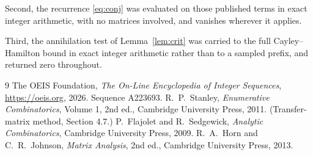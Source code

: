 \documentclass[11pt,a4paper]{article}
\theoremstyle{plain}
\theoremstyle{definition}
\begin{document}
Second, the recurrence \eqref{eq:conj} was evaluated on those published terms in exact
integer arithmetic, with no matrices involved, and vanishes wherever it applies.

Third, the annihilation test of Lemma~\ref{lem:crit} was carried to the full
Cayley--Hamilton bound in exact integer arithmetic rather than to a sampled prefix, and
returned zero throughout.

\begin{thebibliography}{9}
 The OEIS Foundation, \emph{The On-Line Encyclopedia of Integer
Sequences}, \url{https://oeis.org}, 2026. Sequence A223693.
 R.~P.~Stanley, \emph{Enumerative Combinatorics}, Volume 1, 2nd ed.,
Cambridge University Press, 2011. (Transfer-matrix method, Section 4.7.)
 P.~Flajolet and R.~Sedgewick, \emph{Analytic Combinatorics}, Cambridge
University Press, 2009.
 R.~A.~Horn and C.~R.~Johnson, \emph{Matrix Analysis}, 2nd ed., Cambridge
University Press, 2013.
\end{thebibliography}
\end{document}

